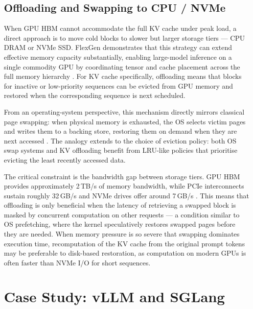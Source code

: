 \documentclass[10pt, a4paper]{article}
\begin{document}

\subsection{Offloading and Swapping to CPU / NVMe}

When GPU HBM cannot accommodate the full KV cache under peak load,
a direct approach is to move cold blocks to slower but larger storage
tiers --- CPU DRAM or NVMe SSD.
FlexGen demonstrates that this strategy can extend effective memory
capacity substantially, enabling large-model inference on a single
commodity GPU by coordinating tensor and cache placement across the
full memory hierarchy \cite{sheng2023flexgen}.
For KV cache specifically, offloading means that blocks for inactive
or low-priority sequences can be evicted from GPU memory and restored
when the corresponding sequence is next scheduled.

From an operating-system perspective, this mechanism directly mirrors
classical page swapping: when physical memory is exhausted, the OS
selects victim pages and writes them to a backing store, restoring
them on demand when they are next accessed \cite{silberschatz2018os}.
The analogy extends to the choice of eviction policy: both OS swap
systems and KV offloading benefit from LRU-like policies that
prioritise evicting the least recently accessed data.

The critical constraint is the bandwidth gap between storage tiers.
GPU HBM provides approximately 2\,TB/s of memory bandwidth, while
PCIe interconnects sustain roughly 32\,GB/s and NVMe drives offer
around 7\,GB/s \cite{sheng2023flexgen}.
This means that offloading is only beneficial when the latency of
retrieving a swapped block is masked by concurrent computation on
other requests --- a condition similar to OS prefetching, where the
kernel speculatively restores swapped pages before they are needed.
When memory pressure is so severe that swapping dominates execution
time, recomputation of the KV cache from the original prompt tokens
may be preferable to disk-based restoration, as computation on modern
GPUs is often faster than NVMe I/O for short sequences.
\section{Case Study: vLLM and SGLang}
\label{sec:casestudy}
\end{document}
